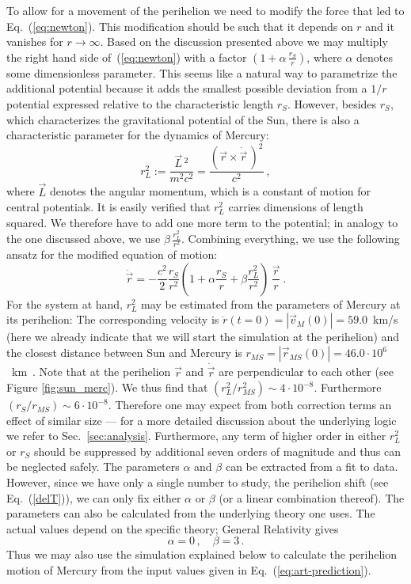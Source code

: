 \documentclass[12pt,ngerman,american]{iopart}
\newcommand{\abs}[1]{\left\vert #1 \right\vert}
\begin{document}
To allow for a movement of the perihelion we need to modify the force that led to Eq.~(\ref{eq:newton}).
This modification should be such that it depends on $r$ and it vanishes for $r\to \infty$.
Based on the discussion presented above we may multiply the right hand side of~(\ref{eq:newton}) with a factor
$(1+\alpha \, \frac{r_S}{r} )$, where $\alpha$ denotes some dimensionless parameter.
This seems like a natural way to parametrize the additional potential because it adds the smallest possible deviation from a $1/r$ potential expressed relative to the characteristic length $r_S$.
However, besides $r_S$, which characterizes the gravitational potential of the Sun, there is also a characteristic parameter for the dynamics of Mercury:
\begin{equation}
r_L^2 := \frac{\vec L\,^2}{m^2c^2}= \frac{{(\vec r\times \dot{\vec r} \, )}^2}{c^2} \ , \label{a2def}
\end{equation}
where $\vec L$ denotes the angular momentum, which is a constant of motion for central potentials.
It is easily verified that $r_L^2$ carries dimensions of length squared.
We therefore have to add one more term to the potential; in analogy to the one discussed above, we use $\beta \, \frac{r_L^2}{r^2}$.
Combining everything, we use the following ansatz for the modified equation of motion:
\begin{equation}
\ddot{\vec r} = - \frac{c^2}{2}\frac{r_S}{r^2}\left(1+\alpha\frac{r_S}{r}+\beta\frac{r_L^2}{r^2}\right) \, \frac{\vec{r}}{r} \ .
\label{eq:newton_art}
\end{equation}
For the system at hand, $r_L^2$ may be estimated from the parameters of Mercury at its perihelion: The corresponding velocity is
 $\dot{ r}(t=0)=\abs{\vec v_M(0)} = 59.0$~km/s (here we already indicate that we will start the simulation at the perihelion) and the closest distance between Sun and Mercury is
$ r_{MS}=\abs{\vec r_{MS}(0)} = 46.0 \cdot 10^6$~km~\cite{MercuryFactSheet}. Note that at the perihelion $\vec r$ and $\dot{\vec r}$ are perpendicular to each other (see Figure \ref{fig:sun_merc}).
We thus find that $(r_L^2/ r_{MS}^2) \sim 4\cdot10^{-8}$. Furthermore $(r_S/r_{MS})\sim6\cdot 10^{-8}$.
Therefore one may expect from both correction terms an effect of similar size --- for a more detailed discussion about the underlying logic we refer to Sec.~\ref{sec:analysis}.
Furthermore, any term of higher order in either $r_L^2$ or $r_S$
should be suppressed by additional seven orders of magnitude and thus can be neglected safely.
The parameters $\alpha$ and $\beta$ can be extracted from a fit to data.
However, since we have only a single number to study, the perihelion shift (see Eq.~(\ref{delT})),
we can only fix either $\alpha$ or $\beta$ (or a linear combination thereof).
The parameters can also be calculated from the underlying theory one uses. The actual values depend on the specific theory;
General Relativity gives~\cite{Einstein}
\begin{equation}
	\alpha = 0 \, , \quad \beta = 3 \, . \label{eq:art-prediction}
\end{equation}
Thus we may also use the simulation explained below to calculate the perihelion motion of Mercury from the input
values given in Eq.~(\ref{eq:art-prediction}).
\end{document}
